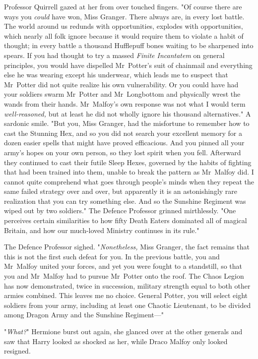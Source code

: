 Professor Quirrell gazed at her from over touched fingers. "Of course there are
ways you \emph{could} have won, Miss Granger. There always are, in every lost
battle. The world around us redunds with opportunities, explodes with
opportunities, which nearly all folk ignore because it would require them to
violate a habit of thought; in every battle a thousand Hufflepuff bones waiting
to be sharpened into spears. If you had thought to try a massed \emph{Finite
Incantatem} on general principles, you would have dispelled Mr~Potter's suit
of chainmail and everything else he was wearing except his underwear, which
leads me to suspect that Mr~Potter did not quite realize his own
vulnerability. Or you could have had your soldiers swarm Mr~Potter and
Mr~Longbottom and physically wrest the wands from their hands. Mr~Malfoy's
own response was not what I would term \emph{well-reasoned,} but at least he
did not wholly ignore his thousand alternatives." A sardonic smile. "But you,
Miss Granger, had the misfortune to remember how to cast the Stunning Hex, and
so you did not search your excellent memory for a dozen easier spells that
might have proved efficacious. And you pinned all your army's hopes on your own
person, so they lost spirit when you fell. Afterward they continued to cast
their futile Sleep Hexes, governed by the habits of fighting that had been
trained into them, unable to break the pattern as Mr~Malfoy did. I cannot
quite comprehend what goes through people's minds when they repeat the same
failed strategy over and over, but apparently it is an astonishingly rare
realization that you can try something else. And so the Sunshine Regiment was
wiped out by two soldiers." The Defence Professor grinned mirthlessly. "One
perceives certain similarities to how fifty Death Eaters dominated all of
magical Britain, and how our much-loved Ministry continues in its rule."

The Defence Professor sighed. "\emph{Nonetheless,} Miss Granger, the fact
remains that this is not the first such defeat for you. In the previous battle,
you and Mr~Malfoy united your forces, and yet you were fought to a standstill,
so that you and Mr~Malfoy had to pursue Mr~Potter onto the roof. The Chaos
Legion has now demonstrated, twice in succession, military strength equal to
both other armies combined. This leaves me no choice. General Potter, you will
select eight soldiers from your army, including at least one Chaotic
Lieutenant, to be divided among Dragon Army and the Sunshine Regiment---"

"\emph{What?}" Hermione burst out again, she glanced over at the other generals
and saw that Harry looked as shocked as her, while Draco Malfoy only looked
resigned.

